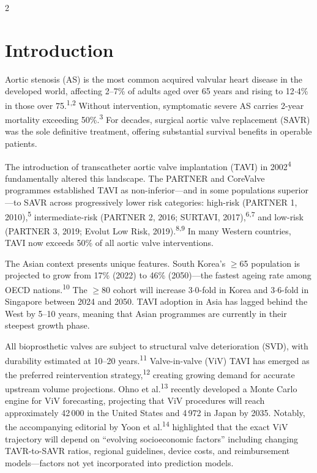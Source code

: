 \documentclass[10pt, a4paper]{article}
\begin{document}
\vspace{16pt}

\begin{multicols}{2}

\section{Introduction}

Aortic stenosis (AS) is the most common acquired valvular heart disease in the developed world, affecting 2--7\% of adults aged over 65 years and rising to 12$\cdot$4\% in those over 75.\textsuperscript{1,2} Without intervention, symptomatic severe AS carries 2-year mortality exceeding 50\%.\textsuperscript{3} For decades, surgical aortic valve replacement (SAVR) was the sole definitive treatment, offering substantial survival benefits in operable patients.

The introduction of transcatheter aortic valve implantation (TAVI) in 2002\textsuperscript{4} fundamentally altered this landscape. The PARTNER and CoreValve programmes established TAVI as non-inferior---and in some populations superior---to SAVR across progressively lower risk categories: high-risk (PARTNER 1, 2010),\textsuperscript{5} intermediate-risk (PARTNER 2, 2016; SURTAVI, 2017),\textsuperscript{6,7} and low-risk (PARTNER 3, 2019; Evolut Low Risk, 2019).\textsuperscript{8,9} In many Western countries, TAVI now exceeds 50\% of all aortic valve interventions.

The Asian context presents unique features. South Korea's $\geq$65 population is projected to grow from 17\% (2022) to 46\% (2050)---the fastest ageing rate among OECD nations.\textsuperscript{10} The $\geq$80 cohort will increase 3$\cdot$0-fold in Korea and 3$\cdot$6-fold in Singapore between 2024 and 2050. TAVI adoption in Asia has lagged behind the West by 5--10 years, meaning that Asian programmes are currently in their steepest growth phase.

All bioprosthetic valves are subject to structural valve deterioration (SVD), with durability estimated at 10--20 years.\textsuperscript{11} Valve-in-valve (ViV) TAVI has emerged as the preferred reintervention strategy,\textsuperscript{12} creating growing demand for accurate upstream volume projections. Ohno et al.\textsuperscript{13} recently developed a Monte Carlo engine for ViV forecasting, projecting that ViV procedures will reach approximately 42\,000 in the United States and 4\,972 in Japan by 2035. Notably, the accompanying editorial by Yoon et al.\textsuperscript{14} highlighted that the exact ViV trajectory will depend on ``evolving socioeconomic factors'' including changing TAVR-to-SAVR ratios, regional guidelines, device costs, and reimbursement models---factors not yet incorporated into prediction models.


\end{multicols}
\end{document}
